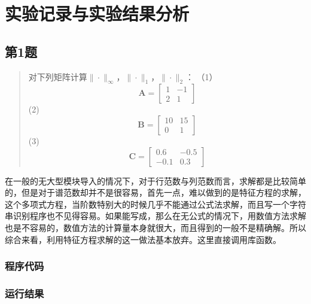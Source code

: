 \section{实验记录与实验结果分析}

\subsection{第1题}
\begin{quote}
    {\kaishu
    对下列矩阵计算$\|\cdot\|_{\infty}$，$\|\cdot\|_{1}$，$\|\cdot\|_{2}$：
    （1）\begin{equation}
            \mathbf{A}=\left[ \begin{array}{rr}{1} & {-1} \\ {2} & {1}\end{array}\right]
        \end{equation}
    (2) \begin{equation}
            \mathbf{B}=\left[ \begin{array}{rr}{10} & {15} \\ {0} & {1}\end{array}\right]
        \end{equation}
    (3) \begin{equation}
            \mathbf{C}=\left[ \begin{array}{rr}{0.6} & {-0.5} \\ {-0.1} & {0.3}\end{array}\right]
        \end{equation}
    }
\end{quote}
在一般的无大型模块导入的情况下，对于行范数与列范数而言，求解都是比较简单的，但是对于谱范数却并不是很容易，首先一点，难以做到的是特征方程的求解，这个多项式方程，当阶数特别大的时候几乎不能通过公式法求解，而且写一个字符串识别程序也不见得容易。如果能写成，那么在无公式的情况下，用数值方法求解也是不容易的，数值方法的计算量本身就很大，而且得到的一般不是精确解。所以综合来看，利用特征方程求解的这一做法基本放弃。这里直接调用库函数。

\subsubsection{程序代码}



\subsubsection{运行结果}

